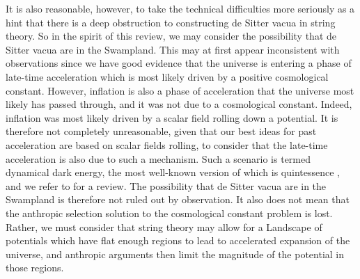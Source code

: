 \documentclass[11pt,a4paper]{article}
\numberwithin{equation}{section}
\numberwithin{table}{section}\setlength{\multlinegap}{25pt}
\begin{document}
{It is also reasonable, however, to take the technical difficulties more seriously as a hint that there is a deep obstruction to constructing de Sitter vacua in string theory. So in the spirit of this review, we may consider the possibility that de Sitter vacua are in the Swampland. This may at first appear inconsistent with observations since we have good evidence that the universe is entering a phase of late-time acceleration which is most likely driven by a positive cosmological constant. However, inflation is also a phase of acceleration that the universe most likely has passed through, and it was not due to a cosmological constant. Indeed, inflation was most likely driven by a scalar field rolling down a potential. It is therefore not completely unreasonable, given that our best ideas for past acceleration are based on scalar fields rolling, to consider that the late-time acceleration is also due to such a mechanism. Such a scenario is termed dynamical dark energy, the most well-known version of which is quintessence \cite{WETTERICH1988668,PhysRevD.37.3406}, and we refer to \cite{Copeland:2006wr} for a review. The possibility that de Sitter vacua are in the Swampland is therefore not ruled out by observation. It also does not mean that the anthropic selection solution to the cosmological constant problem is lost. Rather, we must consider that string theory may allow for a Landscape of potentials which have flat enough regions to lead to accelerated expansion of the universe, and anthropic arguments then limit the magnitude of the potential in those regions. 

}
\end{document}
